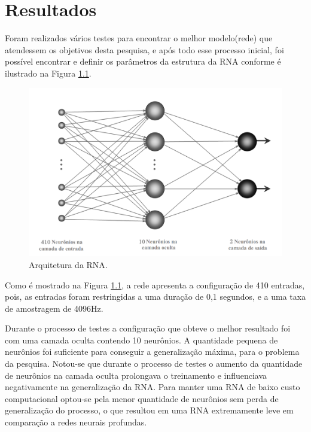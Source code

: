 \chapter{Resultados}
\label{chap:resultados}

Foram realizados vários testes para encontrar o melhor modelo(rede) que atendessem os objetivos desta pesquisa, e após todo esse processo inicial, foi possível encontrar e definir os parâmetros da estrutura da RNA conforme é ilustrado na Figura \ref{fig:arquiteturarede}.

\begin{figure}[H]
\centering
\includegraphics[width=1\textwidth]{figuras/arquitetura_rede.png}
\caption{Arquitetura da RNA.}
\label{fig:arquiteturarede}
\end{figure}

Como é mostrado na Figura \ref{fig:arquiteturarede}, a rede apresenta a configuração de 410 entradas, pois, as entradas foram restringidas a uma duração de 0,1 segundos, e a uma taxa de amostragem de 4096Hz.

Durante o processo de testes a configuração que obteve o melhor resultado foi com uma camada oculta contendo 10 neurônios. A quantidade pequena de neurônios foi suficiente para conseguir a generalização máxima, para o problema da pesquisa. Notou-se que durante o processo de testes o aumento da quantidade de neurônios na camada oculta prolongava o treinamento e influenciava negativamente na generalização da RNA. Para manter uma RNA de baixo custo computacional optou-se pela menor quantidade de neurônios sem perda de generalização do processo, o que resultou em uma RNA extremamente leve em comparação a redes neurais profundas. 

